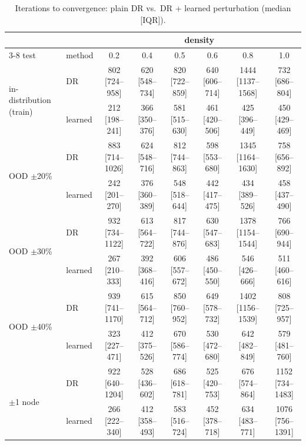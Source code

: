 \begin{table}[H]
  \centering
  \caption{Iterations to convergence: plain DR vs.\ DR + learned perturbation (median [IQR]).}
  \label{tab:iterations_std}
  \small
  \begin{tabular}{ll cccccc}
    \toprule
    & & \multicolumn{6}{c}{density} \\
    \cmidrule(lr){3-8}
    test & method & 0.2 & 0.4 & 0.5 & 0.6 & 0.8 & 1.0 \\
    \midrule
    \multirow{2}{*}{in-distribution (train)}
      & DR      & 802 [724--958] & 620 [548--734] & 820 [722--859] & 640 [606--714] & 1444 [1137--1568] & 732 [686--804] \\
      & learned & 212 [198--241] & 366 [350--376] & 581 [515--630] & 461 [420--506] & 425 [396--449] & 450 [429--469] \\
    \midrule
    \multirow{2}{*}{OOD $\pm$20\%}
      & DR      & 883 [714--1026] & 624 [548--716] & 812 [744--863] & 598 [553--680] & 1345 [1164--1630] & 758 [656--892] \\
      & learned & 242 [201--270] & 376 [360--389] & 548 [518--644] & 442 [417--475] & 434 [389--526] & 458 [437--490] \\
    \midrule
    \multirow{2}{*}{OOD $\pm$30\%}
      & DR      & 932 [734--1122] & 613 [564--722] & 817 [744--876] & 630 [547--683] & 1378 [1154--1544] & 766 [690--944] \\
      & learned & 267 [210--333] & 392 [368--416] & 606 [557--672] & 486 [450--550] & 546 [426--666] & 511 [460--616] \\
    \midrule
    \multirow{2}{*}{OOD $\pm$40\%}
      & DR      & 939 [741--1170] & 615 [564--712] & 850 [760--952] & 649 [578--732] & 1402 [1156--1539] & 808 [725--957] \\
      & learned & 323 [227--471] & 412 [375--526] & 670 [586--774] & 530 [472--680] & 642 [482--849] & 579 [481--760] \\
    \midrule
    \multirow{2}{*}{$\pm$1 node}
      & DR      & 922 [640--1204] & 528 [436--602] & 686 [618--781] & 525 [420--753] & 676 [574--864] & 1152 [734--1483] \\
      & learned & 266 [222--340] & 412 [358--493] & 583 [516--724] & 452 [378--718] & 634 [483--771] & 1076 [756--1391] \\
    \bottomrule
  \end{tabular}
\end{table}
